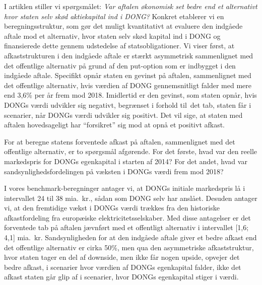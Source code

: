 \documentclass{article}
\begin{document}
I artiklen stiller vi spørgsmålet: \emph{Var aftalen økonomisk set bedre end et alternativt hvor staten selv skød aktiekapital ind i DONG?} Konkret etablerer vi en beregningsstruktur, som gør det muligt kvantitativt at evaluere den indgåede aftale mod et alternativ, hvor staten selv skød kapital ind i DONG og finansierede dette gennem udstedelse af statsobligationer. Vi viser først, at afkaststrukturen i den indgåede aftale er stærkt asymmetrisk sammenlignet med det offentlige alternativ på grund af den put-option som er indbygget i den indgåede aftale. Specifikt opnår staten en gevinst på aftalen, sammenlignet med det offentlige alternativ, hvis værdien af DONG gennemsnitligt falder med mere end 3,6\% per år frem mod 2018. Imidlertid er den gevinst, som staten opnår, hvis DONGs værdi udvikler sig negativt, begrænset i forhold til\ det tab, staten får i scenarier, når DONGs værdi udvikler sig positivt. Det vil sige, at staten med aftalen hovedsageligt har \enquote{forsikret} sig mod at opnå et positivt afkast. 

For at beregne statens forventede afkast på aftalen, sammenlignet med det offentlige alternativ, er to spørgsmål afgørende. For det første, hvad var den reelle markedspris for DONGs egenkapital i starten af 2014? For det andet, hvad var sandsynlighedsfordelingen på væksten i DONGs værdi frem mod 2018? 

I vores benchmark-beregninger antager vi, at DONGs initiale markedspris lå i intervallet 24 til 38 mia.\ kr., sådan som DONG selv har anslået. Desuden antager vi, at den fremtidige vækst i DONGs værdi trækkes fra den historiske afkastfordeling fra europæiske elektricitetsselskaber. Med disse antagelser er det forventede tab på aftalen jævnført med et offentligt alternativ i intervallet [1,6; 4,1] mia.\ kr. Sandsynligheden for at den indgåede aftale giver et bedre afkast end det offentlige alternativ er cirka 50\%, men qua den asymmetriske afkaststruktur, hvor staten tager en del af downside, men ikke får nogen upside, opvejer det bedre afkast, i scenarier hvor værdien af DONGs egenkapital falder, ikke det afkast staten går glip af i  scenarier, hvor DONGs egenkapital stiger i værdi.

\end{document}
